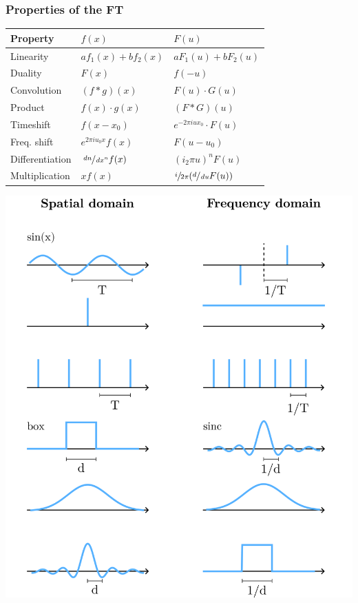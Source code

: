 \documentclass[a4paper,10pt]{article}
\renewcommand*{\arraystretch}{2}
\begin{document}
\subsubsection{Properties of the FT}
\begin{center}
    {\renewcommand{\arraystretch}{1.2}
    \begin{tabularx}{\linewidth}{Xll}
	\toprule
	Property & \( f(x) \) & \( F(u) \) \\
	\midrule
	Linearity & \( af_{1}(x) + bf_{2}(x) \) & \( aF_{1}(u) + bF_{2}(u) \) \\
	Duality & \( F(x) \) & \( f(-u) \) \\
	Convolution & \( (f*g)(x) \) & \( F(u) \cdot G(u) \) \\
	Product & \( f(x) \cdot g(x) \) & \( (F*G)(u) \) \\
	Timeshift & \( f(x -x_{0}) \) & \( e^{-2\pi i ux_{0}} \cdot F(u) \) \\
	Freq. shift & \( e^{2\pi i u_{0}x} f(x) \) & \( F(u - u_{0}) \) \\
	Differentiation & \( \sfrac{\mathop{dn}}{\mathop{dx^n}} f(x) \) & \( (i_{2}\pi u)^n F(u) \) \\
	Multiplication & \( xf(x) \) & \( \sfrac{i}{2\pi } (\sfrac{d}{\mathop{du}} F(u)) \) \\
	\bottomrule
    \end{tabularx}
    }
\end{center}

\begin{center}
    \includegraphics[width=\linewidth]{fourier-transforms.png}
\end{center}
\end{document}

